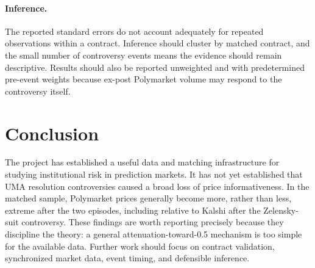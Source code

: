 \documentclass[11pt]{article}
\begin{document}
\paragraph{Inference.}
The reported standard errors do not account adequately for repeated observations within a
contract. Inference should cluster by matched contract, and the small number of controversy
events means the evidence should remain descriptive. Results should also be reported
unweighted and with predetermined pre-event weights because ex-post Polymarket volume may
respond to the controversy itself.

\section{Conclusion}

The project has established a useful data and matching infrastructure for studying
institutional risk in prediction markets. It has not yet established that UMA resolution
controversies caused a broad loss of price informativeness. In the matched sample,
Polymarket prices generally become more, rather than less, extreme after the two episodes,
including relative to Kalshi after the Zelensky-suit controversy. These findings are worth
reporting precisely because they discipline the theory: a general attenuation-toward-0.5
mechanism is too simple for the available data. Further work should focus on contract
validation, synchronized market data, event
timing, and defensible inference.
\end{document}
